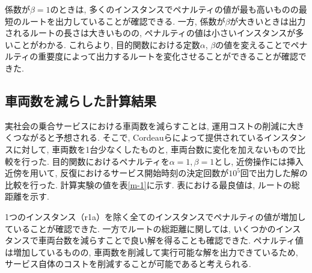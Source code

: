 係数が$\beta=1$のときは, 多くのインスタンスでペナルティの値が最も高いものの最短のルートを出力していることが確認できる. 一方, 係数が$\beta$が大きいときは出力されるルートの長さは大きいものの, ペナルティの値は小さいインスタンスが多いことがわかる.
これらより, 目的関数における定数$\alpha$, $\beta$の値を変えることでペナルティの重要度によって出力するルートを変化させることができることが確認できた.

\subsection{車両数を減らした計算結果}
実社会の乗合サービスにおける車両数を減らすことは, 運用コストの削減に大きくつながると予想される. そこで, Cordeauらによって提供されているインスタンスに対して, 車両数を1台少なくしたものと, 車両台数に変化を加えないもので比較を行った. 目的関数におけるペナルティを$\alpha=1, \beta=1$とし, 近傍操作には挿入近傍を用いて, 反復におけるサービス開始時刻の決定回数が$10^5$回で出力した解の比較を行った. 計算実験の値を表\ref{m-1}に示す. 表における最良値は, ルートの総距離を示す.

1つのインスタンス（r1a）を除く全てのインスタンスでペナルティの値が増加していることが確認できた. 一方でルートの総距離に関しては, いくつかのインスタンスで車両台数を減らすことで良い解を得ることも確認できた. ペナルティ値は増加しているものの, 車両数を削減して実行可能な解を出力できているため, サービス自体のコストを削減することが可能であると考えられる.

